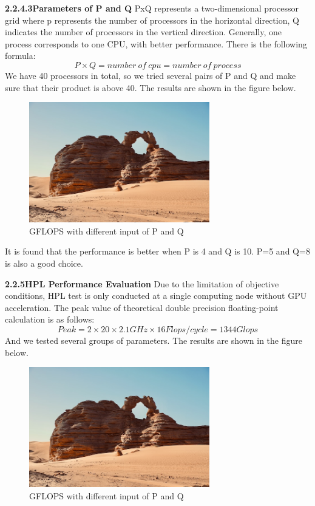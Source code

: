 \documentclass[a4paper,12pt]{article}
\begin{document}
\textbf{2.2.4.3Parameters of P and Q}
PxQ represents a two-dimensional processor grid where p represents the number of processors in the horizontal direction, Q indicates the number of processors in the vertical direction. Generally, one process corresponds to one CPU, with better performance. There is the following formula:
\begin{equation*}
P \times Q = number\ of\ cpu = number\ of\ process
\end{equation*}
We have 40 processors in total, so we tried several pairs of P and Q and make sure that their product is above 40. The results are shown in the figure below.

\begin{figure}[H]
    \centering
    \includegraphics[width=0.7\textwidth]{GFLOPS_PQ.png}
    \caption{GFLOPS with different input of P and Q}
    \label{fig:gflops_pq}
\end{figure}

It is found that the performance is better when P is 4 and Q is 10. P=5 and Q=8 is also a good choice.

\textbf{2.2.5HPL Performance Evaluation}
Due to the limitation of objective conditions, HPL test is only conducted at a single computing node without GPU acceleration. The peak value of theoretical double precision floating-point calculation is as follows:
\begin{equation*}
Peak = 2 \times 20 \times 2.1GHz \times 16Flops/cycle = 1344Glops
\end{equation*}
And we tested several groups of parameters. The results are shown in the figure below.

\begin{figure}[H]
    \centering
    \includegraphics[width=0.7\textwidth]{GFLOPS_PQ_NB.png}
    \caption{GFLOPS with different input of P and Q}
    \label{fig:gflops_pq_nb}
\end{figure}
\end{document}
